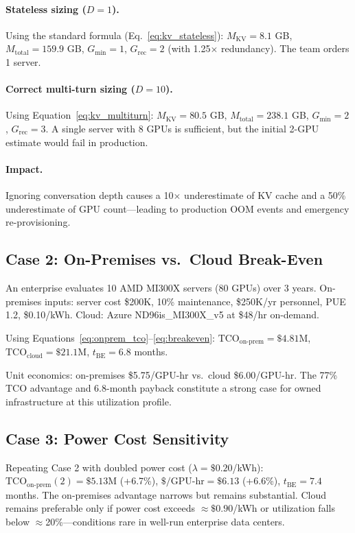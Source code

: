 \documentclass{article}
\begin{document}
\paragraph{Stateless sizing ($D{=}1$).}
Using the standard formula (Eq.~\ref{eq:kv_stateless}):
$M_{\text{KV}} = 8.1$ GB, $M_{\text{total}} = 159.9$ GB,
$G_{\min} = 1$, $G_{\text{rec}} = 2$ (with 1.25$\times$ redundancy).
The team orders 1 server.

\paragraph{Correct multi-turn sizing ($D{=}10$).}
Using Equation~\ref{eq:kv_multiturn}:
$M_{\text{KV}} = 80.5$ GB, $M_{\text{total}} = 238.1$ GB,
$G_{\min} = 2$, $G_{\text{rec}} = 3$.
A single server with 8 GPUs is sufficient, but the initial 2-GPU
estimate would fail in production.

\paragraph{Impact.} Ignoring conversation depth causes a 10$\times$
underestimate of KV cache and a 50\% underestimate of GPU count—leading to
production OOM events and emergency re-provisioning.

\subsection{Case 2: On-Premises vs.\ Cloud Break-Even}

An enterprise evaluates 10 AMD MI300X servers (80 GPUs) over 3 years.
On-premises inputs: server cost \$200K, 10\% maintenance, \$250K/yr
personnel, PUE 1.2, \$0.10/kWh.
Cloud: Azure ND96is\_MI300X\_v5 at \$48/hr on-demand.

Using Equations~\ref{eq:onprem_tco}--\ref{eq:breakeven}:
$\text{TCO}_{\text{on-prem}} = \$4.81\text{M}$,
$\text{TCO}_{\text{cloud}} = \$21.1\text{M}$,
$t_{\text{BE}} = 6.8$ months.

Unit economics: on-premises \$5.75/GPU-hr vs.\ cloud \$6.00/GPU-hr.
The 77\% TCO advantage and 6.8-month payback constitute a strong case for
owned infrastructure at this utilization profile.

\subsection{Case 3: Power Cost Sensitivity}

Repeating Case 2 with doubled power cost ($\lambda = \$0.20$/kWh):
$\text{TCO}_{\text{on-prem}}(2) = \$5.13\text{M}$ (+6.7\%),
$\$/\text{GPU-hr} = \$6.13$ (+6.6\%),
$t_{\text{BE}} = 7.4$ months.
The on-premises advantage narrows but remains substantial.
Cloud remains preferable only if power cost exceeds $\approx\$0.90$/kWh
or utilization falls below $\approx$20\%—conditions rare in well-run
enterprise data centers.
\end{document}
